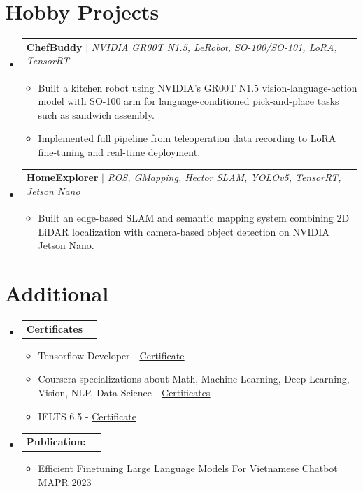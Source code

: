 \documentclass[letterpaper,11pt]{article}
\makeatletter
\newcommand{\resumeItem}[1]{
  \item\small{
    {#1 \vspace{-2pt}}
  }
}
\newcommand{\resumeProjectHeading}[2]{
    \item
    \begin{tabular*}{0.97\textwidth}{l@{\extracolsep{\fill}}r}
      \footnotesize#1 & \textbf{\footnotesize #2}\\
    \end{tabular*}\vspace{-7pt}
}
\newcommand{\resumeSubHeadingListStart}{\begin{itemize}[leftmargin=0.0in, label={}]}
\newcommand{\resumeSubHeadingListEnd}{\end{itemize}}
\newcommand{\resumeItemListStart}{\begin{itemize}}
\newcommand{\resumeItemListEnd}{\end{itemize}\vspace{-5pt}}
\makeatother
\begin{document}
\section{Hobby Projects}
    \resumeSubHeadingListStart
      \resumeProjectHeading
          {\textbf{ChefBuddy} $|$ \emph{NVIDIA GR00T N1.5, LeRobot, SO-100/SO-101, LoRA, TensorRT}}{}
          \resumeItemListStart
            \resumeItem{Built a kitchen robot using NVIDIA's GR00T N1.5 vision-language-action model with SO-100 arm for language-conditioned pick-and-place tasks such as sandwich assembly.}
            \resumeItem{Implemented full pipeline from teleoperation data recording to LoRA fine-tuning and real-time deployment.}
          \resumeItemListEnd

      \resumeProjectHeading
          {\textbf{HomeExplorer} $|$ \emph{ROS, GMapping, Hector SLAM, YOLOv5, TensorRT, Jetson Nano}}{}
          \resumeItemListStart
            \resumeItem{Built an edge-based SLAM and semantic mapping system combining 2D LiDAR localization with camera-based object detection on NVIDIA Jetson Nano.}
          \resumeItemListEnd
    \resumeSubHeadingListEnd

\section{Additional}
    \resumeSubHeadingListStart
        \resumeProjectHeading
          {\textbf{Certificates}}{}
          \resumeItemListStart
            \resumeItem{Tensorflow Developer - \href{https://www.credential.net/6d8db6f4-24ab-42a6-bbdd-a31299b58d2c}{\underline{Certificate}} }
            \resumeItem{ Coursera specializations about Math, Machine Learning, Deep Learning, Vision, NLP, Data Science - \href{https://drive.google.com/drive/folders/1MesuuivR7FrZzcSStyVPlOYw0rH2co6w}{\underline{Certificates}}  }
            \resumeItem{IELTS 6.5 - \href{https://drive.google.com/file/d/1OUYZ5Y5WAamm9ywC7x6ThLkV99Q2z_pp/view?usp=sharing}{\underline{Certificate}} }
          \resumeItemListEnd

        \resumeProjectHeading
          {\textbf{Publication:}}{}
          \resumeItemListStart
            \resumeItem{Efficient Finetuning Large Language Models For Vietnamese Chatbot \href{https://ieeexplore.ieee.org/document/10288647}{\underline{MAPR}} 2023 }
          \resumeItemListEnd

    \resumeSubHeadingListEnd


\end{document}
